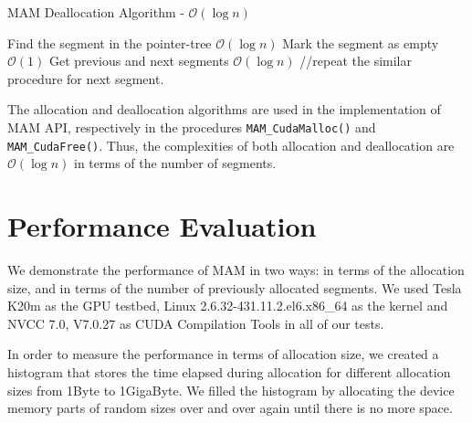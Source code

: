 \documentclass[conference]{IEEEtran}
\def\code#1{\texttt{#1}}
\begin{document}
\begin{algorithm}                                                                                                  
\caption{MAM Deallocation Algorithm - $\mathcal{O}(\log n)$}                                                                     
\label{algorithm2}                                                                                      
\begin{algorithmic}[1] 
\State Find the segment in the pointer-tree $\mathcal{O}(\log n)$
\State Mark the segment as empty $\mathcal{O}(1)$
\State Get previous and next segments $\mathcal{O}(\log n)$
\EndIf
	\State //repeat the similar procedure for next segment. 
\EndProcedure
\end{algorithmic} 
\end{algorithm}




The allocation and deallocation algorithms are used in the implementation of MAM API, respectively in the procedures \code{MAM\_CudaMalloc()} and \code{MAM\_CudaFree()}. Thus, the complexities of both allocation and deallocation are $\mathcal{O}(\log n)$ in terms of the number of segments.


\section{Performance Evaluation}
We demonstrate the performance of MAM in two ways: 
in terms of the allocation size, and in terms of the number of previously allocated segments.
We used Tesla K20m as the GPU testbed, Linux 2.6.32-431.11.2.el6.x86\_64 as the kernel and NVCC 7.0, V7.0.27 as CUDA Compilation Tools in all of our tests.

In order to measure the performance in terms of allocation size, 
we created a histogram that stores the time elapsed during allocation 
for different allocation sizes from 1Byte to 1GigaByte.
We filled the histogram by allocating the device memory 
 parts of random sizes over and over again until there is no more space. 
\end{document}
